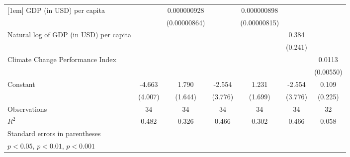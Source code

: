 {\begin{tabular}{l*{6}{c}}
[1em]
GDP (in USD) per capita&                     & 0.000000928         &                     & 0.000000898         &                     &                     \\
                    &                     &(0.00000864)         &                     &(0.00000815)         &                     &                     \\
[1em]
Natural log of GDP (in USD) per capita&                     &                     &                     &                     &       0.384         &                     \\
                    &                     &                     &                     &                     &     (0.241)         &                     \\
[1em]
Climate Change Performance Index&                     &                     &                     &                     &                     &      0.0113         \\
                    &                     &                     &                     &                     &                     &   (0.00550)         \\
[1em]
Constant            &      -4.663         &       1.790         &      -2.554         &       1.231         &      -2.554         &       0.109         \\
                    &     (4.007)         &     (1.644)         &     (3.776)         &     (1.699)         &     (3.776)         &     (0.225)         \\
\hline
Observations        &          34         &          34         &          34         &          34         &          34         &          32         \\
\(R^{2}\)           &       0.482         &       0.326         &       0.466         &       0.302         &       0.466         &       0.058         \\
\hline\hline
\multicolumn{7}{l}{\footnotesize Standard errors in parentheses}\\
\multicolumn{7}{l}{\footnotesize \sym{*} \(p<0.05\), \sym{**} \(p<0.01\), \sym{***} \(p<0.001\)}\\
\end{tabular}
}
